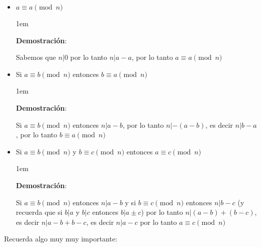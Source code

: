 \documentclass[12pt, fleqn]{report}                             %
\newenvironment{SmallIndentation}[1][0.75em]                    %
    {\begin{adjustwidth}{#1}{}\begin{footnotesize}}                 %
    {\end{footnotesize}\end{adjustwidth}}                           %
\begin{document}
            \begin{itemize}
                \item
                    $ a \equiv a \pmod{n}$

                    \begin{SmallIndentation}[1em]
                        \textbf{Demostración}:

                        Sabemos que $n|0$ por lo tanto $n|a-a$, por lo tanto
                        $ a \equiv a \pmod{n}$

                    \end{SmallIndentation}

                \item
                    Si $a \equiv b \pmod{n}$ entonces $b \equiv a \pmod{n}$

                    \begin{SmallIndentation}[1em]
                        \textbf{Demostración}:

                        Si $a \equiv b \pmod{n}$ entonces $n | a - b$, por lo tanto
                        $n | -(a - b)$, es decir $n|b-a$, por lo tanto $b \equiv a \pmod{n}$

                    \end{SmallIndentation}


                \item
                    Si $a \equiv b \pmod{n}$ y $b \equiv c \pmod{n}$ entonces
                    $a \equiv c \pmod{n}$

                    \begin{SmallIndentation}[1em]
                        \textbf{Demostración}:

                        Si $a \equiv b \pmod{n}$ entonces $n | a - b$ y si
                        $b \equiv c \pmod{n}$ entonces $n | b - c$ (y recuerda
                        que si $b|a$ y $b|c$ entonces $b|a \pm c$) por lo tanto
                        $n | (a-b)+(b-c)$, es decir $n|a-b+b-c$, es decir $n|a-c$
                        por lo tanto $a \equiv c \pmod{n}$

                    \end{SmallIndentation}

            \end{itemize}

            Recuerda algo muy muy importante:
\end{document}
